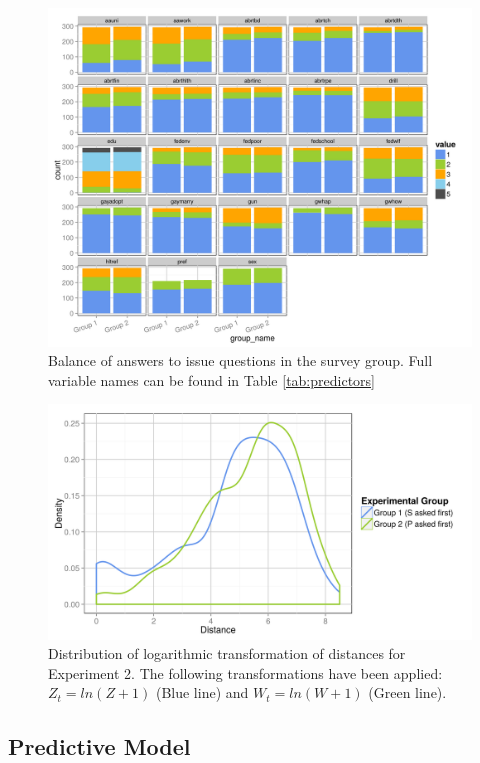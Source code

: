 \begin{figure}[ht!]
  \centering
  \includegraphics{../figures/main/bal.png}
  \caption{Balance of answers to issue questions in the survey group. Full variable names can be found in Table \ref{tab:predictors}}
  \label{fig:bal}
\end{figure}

\begin{figure}[ht!]
  \centering
  \includegraphics{../figures/main/dist_dista_log.png}
  \caption{Distribution of logarithmic transformation of distances for Experiment 2. The following transformations have been applied: $Z_t = ln(Z + 1)$ (Blue line) and $W_t = ln(W + 1)$ (Green line).}
  \label{fig:d_dist_log}
\end{figure}


\clearpage

\subsection{Predictive Model}

